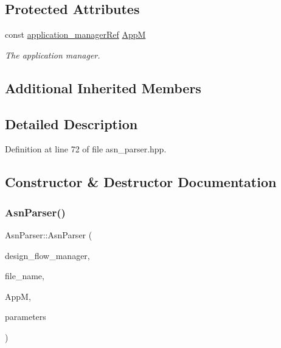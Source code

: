 \subsection*{Protected Attributes}
\begin{DoxyCompactItemize}
\item 
const \hyperlink{application__manager_8hpp_a04ccad4e5ee401e8934306672082c180}{application\+\_\+manager\+Ref} \hyperlink{classAsnParser_a4e0a80b38bb3eca0c3c6641bf6173fff}{AppM}
\begin{DoxyCompactList}\small\item\em The application manager. \end{DoxyCompactList}\end{DoxyCompactItemize}
\subsection*{Additional Inherited Members}


\subsection{Detailed Description}


Definition at line 72 of file asn\+\_\+parser.\+hpp.



\subsection{Constructor \& Destructor Documentation}
\mbox{\label{classAsnParser_a82d6e881bf9cff853a03b9cc83d23532}} 
\subsubsection{\texorpdfstring{Asn\+Parser()}{AsnParser()}}
{\footnotesize\ttfamily Asn\+Parser\+::\+Asn\+Parser (\begin{DoxyParamCaption}\item[{const Design\+Flow\+Manager\+Const\+Ref}]{design\+\_\+flow\+\_\+manager,  }\item[{const std\+::string \&}]{file\+\_\+name,  }\item[{const \hyperlink{application__manager_8hpp_a04ccad4e5ee401e8934306672082c180}{application\+\_\+manager\+Ref}}]{AppM,  }\item[{const \hyperlink{Parameter_8hpp_a37841774a6fcb479b597fdf8955eb4ea}{Parameter\+Const\+Ref}}]{parameters }\end{DoxyParamCaption})}



